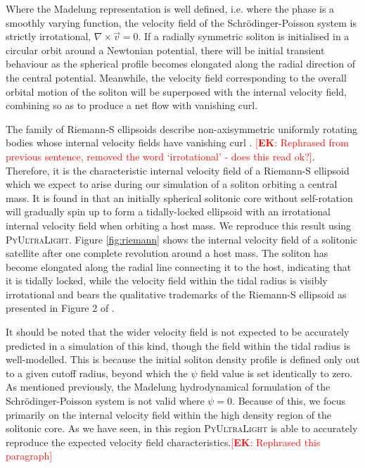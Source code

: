 \documentclass[a4paper,11pt]{article}
\newcommand{\PyUltraLight}{\textsc{PyUltraLight}\xspace}
\newcommand{\ek}[1]{\textcolor{red}{[{\bf EK}: #1]}}
\begin{document}
Where the Madelung representation is well defined, i.e. where the phase is a smoothly varying function, the velocity field of the Schr{\"o}dinger-Poisson system is strictly irrotational, $\nabla\times\vec{v}=0$. If a radially symmetric soliton is initialised in a circular orbit around a Newtonian potential, there will be initial transient behaviour as the spherical profile becomes elongated along the radial direction of the central potential. Meanwhile, the velocity field corresponding to the overall orbital motion of the soliton will be superposed with the internal velocity field, combining so as to produce a net flow with vanishing curl. 

The family of Riemann-S ellipsoids describe non-axisymmetric uniformly rotating bodies whose internal velocity fields have vanishing curl \cite{Chandrasekhar1965}. \ek{Rephrased from previous sentence, removed the word `irrotational' - does this read ok?}. Therefore, it is the characteristic internal velocity field of a Riemann-S ellipsoid which we expect to arise during our simulation of a soliton orbiting a central mass. It is found in \cite{Du2018} that an initially spherical solitonic core without self-rotation will gradually spin up to form a tidally-locked ellipsoid with an irrotational internal velocity field when orbiting a host mass. We reproduce this result using \PyUltraLight. Figure \ref{fig:riemann} shows the internal velocity field of a solitonic satellite after one complete revolution around a host mass. The soliton has become elongated along the radial line connecting it to the host, indicating that it is tidally locked, while the velocity field within the tidal radius is visibly irrotational and bears the qualitative trademarks of the Riemann-S ellipsoid as presented in Figure 2 of \cite{Daller2012}. 

It should be noted that the wider velocity field is not expected to be accurately predicted in a simulation of this kind, though the field within the tidal radius is well-modelled. This is because the initial soliton density profile is defined only out to a given cutoff radius, beyond which the $\psi$ field value is set identically to zero. As mentioned previously, the Madelung hydrodynamical formulation of the Schr{\"o}dinger-Poisson system is not valid where $\psi=0$. Because of this, we focus primarily on the internal velocity field within the high density region of the solitonic core. As we have seen, in this region \PyUltraLight is able to accurately reproduce the expected velocity field characteristics.\ek{Rephrased this paragraph}
\end{document}
